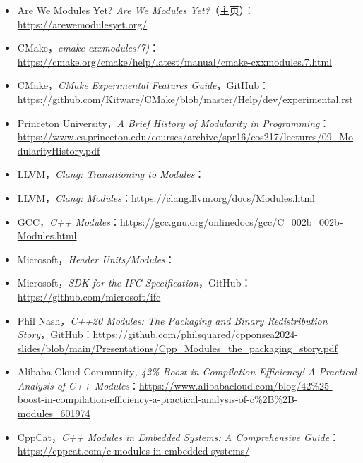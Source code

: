 \begin{itemize}
\item Are We Modules Yet? \emph{Are We Modules Yet?}（主页）：\href{https://arewemodulesyet.org/}{https://arewemodulesyet.org/}
\item CMake，\emph{cmake-cxxmodules(7)}：\href{https://cmake.org/cmake/help/latest/manual/cmake-cxxmodules.7.html}{https://cmake.org/cmake/help/latest/manual/cmake-cxxmodules.7.html}
\item CMake，\emph{CMake Experimental Features Guide}，GitHub：\href{https://github.com/Kitware/CMake/blob/master/Help/dev/experimental.rst}{https://github.com/Kitware/CMake/blob/master/Help/dev/experimental.rst}
\item Princeton University，\emph{A Brief History of Modularity in} \emph{Programming}：\href{https://www.cs.princeton.edu/courses/archive/spr16/cos217/lectures/09_ModularityHistory.pdf}{https://www.cs.princeton.edu/courses/archive/spr16/cos217/lectures/09\_ModularityHistory.pdf}
\item LLVM，\emph{Clang: Transitioning to Modules}：
\item LLVM，\emph{Clang: Modules}：\href{https://clang.llvm.org/docs/Modules.html}{https://clang.llvm.org/docs/Modules.html}
\item GCC，\emph{C++ Modules}：\href{https://gcc.gnu.org/onlinedocs/gcc/C_002b_002b-Modules.html}{https://gcc.gnu.org/onlinedocs/gcc/C\_002b\_002b-Modules.html}
\item Microsoft，\emph{Header Units/Modules}：
\item Microsoft，\emph{SDK for the IFC Specification}，GitHub：\href{https://github.com/microsoft/ifc}{https://github.com/microsoft/ifc}
\item Phil Nash，\emph{C++20 Modules: The Packaging and Binary Redistribution Story}，GitHub：\href{https://github.com/philsquared/cpponsea2024-slides/blob/main/Presentations/Cpp_Modules_the_packaging_story.pdf}{https://github.com/philsquared/cpponsea2024-slides/blob/main/Presentations/Cpp\_Modules\_the\_packaging\_story.pdf}
\item Alibaba Cloud Community\emph{, 42\% Boost in Compilation Efficiency! A Practical Analysis of C++ Modules}：\href{https://www.alibabacloud.com/blog/42\%25-boost-in-compilation-efficiency-a-practical-analysis-of-c\%2B\%2B-modules_601974}{https://www.alibabacloud.com/blog/42\%25-boost-in-compilation-efficiency-a-practical-analysis-of-c\%2B\%2B-modules\_601974}
\item CppCat，\emph{C++ Modules in Embedded Systems: A Comprehensive Guide}：\href{https://cppcat.com/c-modules-in-embedded-systems/}{https://cppcat.com/c-modules-in-embedded-systems/}
\end{itemize}

